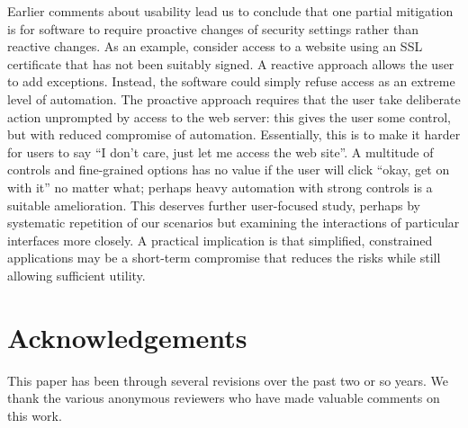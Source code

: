 \documentclass{article}
\begin{document}
Earlier comments about usability lead us to conclude that one partial
mitigation is for software to require proactive changes of security
settings rather than reactive changes.  As an example, consider access
to a website using an SSL certificate that has not been suitably
signed.  A reactive approach allows the user to add exceptions.
Instead, the software could simply refuse access as an extreme level
of automation.  The proactive approach requires that the user take
deliberate action unprompted by access to the web server: this gives
the user some control, but with reduced compromise of automation.
Essentially, this is to make it harder for users to say ``I don't
care, just let me access the web site''.  A multitude of controls and
fine-grained options has no value if the user will click ``okay, get
on with it'' no matter what; perhaps heavy automation with strong
controls is a suitable amelioration.  This deserves further
user-focused study, perhaps by systematic repetition of our scenarios but examining the interactions of particular interfaces more closely.  A practical implication is that simplified,
constrained applications may be a short-term compromise that reduces
the risks
while still allowing sufficient utility.

\section*{Acknowledgements}

This paper has been through several revisions over the past two or so
years.  We thank the various anonymous reviewers who have made
valuable comments on this work.



\end{document}
